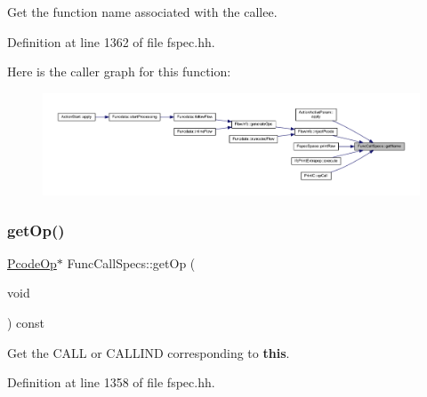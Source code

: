 Get the function name associated with the callee. 



Definition at line 1362 of file fspec.\+hh.

Here is the caller graph for this function\+:
\nopagebreak
\begin{figure}[H]
\begin{center}
\leavevmode
\includegraphics[width=350pt]{class_func_call_specs_a5c5bb2445140cdde864320679ba347b0_icgraph}
\end{center}
\end{figure}
\mbox{\label{class_func_call_specs_ad88ee3058ece9a8b19f4e25566c03121}} 
\subsubsection{\texorpdfstring{getOp()}{getOp()}}
{\footnotesize\ttfamily \mbox{\hyperlink{class_pcode_op}{Pcode\+Op}}$\ast$ Func\+Call\+Specs\+::get\+Op (\begin{DoxyParamCaption}\item[{void}]{ }\end{DoxyParamCaption}) const\hspace{0.3cm}{\ttfamily [inline]}}



Get the C\+A\+LL or C\+A\+L\+L\+I\+ND corresponding to {\bfseries{this}}. 



Definition at line 1358 of file fspec.\+hh.

